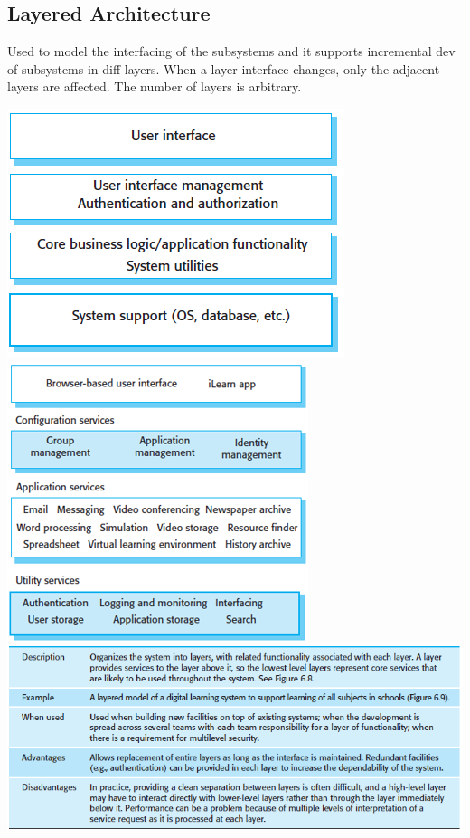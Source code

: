 \documentclass{article}
\begin{document}
    \subsection*{Layered Architecture}    

    Used to model the interfacing of the subsystems and it supports incremental dev 
    of subsystems in diff layers. When a layer interface changes, only the adjacent layers
    are affected. 
    The number of layers is arbitrary.

    \begin{center}
        \includegraphics[scale=0.7]{layered_architecture.png}
        \includegraphics[scale=0.7]{layered_architecture-example.png}
        \includegraphics[scale=0.7]{layered_architecture-desc.png}
    \end{center}
\end{document}
